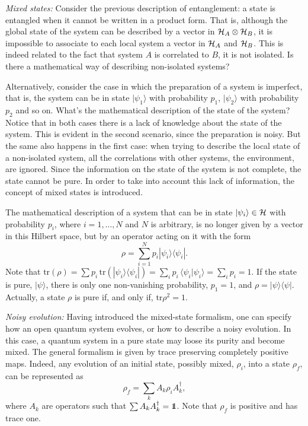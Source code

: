 \documentclass[a4paper]{article}
\def\H{{\cal H}}
\def\tr{\mbox{tr}}
\def\one{\leavevmode\hbox{\small1\normalsize\kern-.33em1}}
\def\bra#1{\langle#1|} \def\ket#1{|#1\rangle}
\def\proj#1{\ket{#1}\!\bra{#1}}
\begin{document}
{\sl Mixed states:} Consider the previous description of
entanglement: a state is entangled when it cannot be written in a
product form. That is, although the global state of the system can
be described by a vector in $\H_A\otimes\H_B$, it is impossible to
associate to each local system a vector in $\H_A$ and $\H_B$. This
is indeed related to the fact that system $A$ is correlated to
$B$, it is not isolated. Is there a mathematical way of describing
non-isolated systems?

Alternatively, consider the case in which the preparation of a
system is imperfect, that is, the system can be in state
$\ket{\psi_1}$ with probability $p_1$, $\ket{\psi_2}$ with
probability $p_2$ and so on. What's the mathematical description
of the state of the system? Notice that in both cases there is a
lack of knowledge about the state of the system. This is evident
in the second scenario, since the preparation is noisy. But the
same also happens in the first case: when trying to describe the
local state of a non-isolated system, all the correlations with
other systems, the environment, are ignored. Since the information
on the state of the system is not complete, the state cannot be
pure. In order to take into account this lack of information, 
the concept of mixed states is introduced.

The mathematical description of a system that can be in state
$\ket{\psi_i}\in\H$ with probability $p_i$, where $i=1,\ldots,N$
and $N$ is arbitrary, is no longer given by a vector in this Hilbert space, 
but by an operator acting on it with the form
\begin{equation}\label{mixst}
    \rho=\sum_{i=1}^N p_i\proj{\psi_i} .
\end{equation}
Note that $\tr(\rho)=\sum p_i\,\tr(\proj{\psi_i})=\sum_i p_i\,
\langle\psi_i\ket{\psi_i}=\sum_i p_i=1$. If the state is pure,
$\ket{\psi}$, there is only one non-vanishing probability, $p_1=1$,
and $\rho=\proj{\psi}$. Actually, a state $\rho$ is pure if, and
only if, $\tr\rho^2=1$.

{\sl Noisy evolution:} Having introduced the mixed-state
formalism, one can specify how an open quantum system evolves, or
how to describe a noisy evolution. In this case, a quantum system
in a pure state may loose its purity and become mixed. The general
formalism is given by trace preserving completely positive maps. Indeed,
any evolution of an initial state, possibly mixed, $\rho_i$, into
a state $\rho_f$, can be represented as
\begin{equation}\label{krausop}
    \rho_f=\sum_k A_k \rho_i A^\dagger_k ,
\end{equation}
where $A_k$ are operators such that $\sum A_kA^\dagger_k=\one$. Note that $\rho_f$ is
positive and has trace one.
\end{document}
